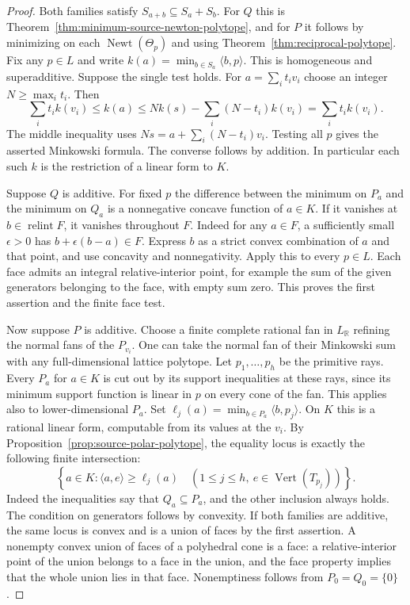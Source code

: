 \documentclass[11pt,reqno]{amsart}
\numberwithin{equation}{section}
\theoremstyle{definition}
\theoremstyle{remark}
\DeclareMathOperator{\Newt}{Newt}
\begin{document}
\begin{proof}
Both families satisfy \(S_{a+b}\subseteq S_a+S_b\). For \(Q\) this is
Theorem~\ref{thm:minimum-source-newton-polytope}, and for \(P\) it
follows by minimizing on each \(\Newt(\Theta_p)\) and using
Theorem~\ref{thm:reciprocal-polytope}. Fix any \(p\in L\) and write
\(k(a)=\min_{b\in S_a}\langle b,p\rangle\). This is homogeneous and
superadditive. Suppose the single test holds. For
\(a=\sum_i t_i v_i\) choose an integer \(N\ge\max_i t_i\). Then
\[ \sum_i t_i k(v_i)\le k(a) \le N k(s)-\sum_i(N-t_i)k(v_i)=\sum_i t_i k(v_i). \]
The middle inequality uses \(Ns=a+\sum_i(N-t_i)v_i\).
Testing all \(p\) gives the asserted Minkowski formula. The converse
follows by addition. In particular each such \(k\) is the restriction
of a linear form to \(K\).

Suppose \(Q\) is additive. For fixed \(p\) the difference between the
minimum on \(P_a\) and the minimum on \(Q_a\) is a nonnegative concave
function of \(a\in K\). If it vanishes at \(b\in\operatorname{relint}F\),
it vanishes throughout \(F\). Indeed for any \(a\in F\), a sufficiently
small \(\epsilon>0\) has \(b+\epsilon(b-a)\in F\). Express \(b\) as a
strict convex combination of \(a\) and that point, and use concavity
and nonnegativity. Apply this to every \(p\in L\). Each face admits an
integral relative-interior point, for example the sum of the given
generators belonging to the face, with empty sum zero. This proves
the first assertion and the finite face test.

Now suppose \(P\) is additive. Choose a finite complete rational fan
in \(L_{\mathbb R}\) refining the normal fans of the \(P_{v_i}\). One
can take the normal fan of their Minkowski sum with any
full-dimensional lattice polytope. Let \(p_1,\ldots,p_h\) be the
primitive rays. Every \(P_a\) for \(a\in K\) is cut out by its support
inequalities at these rays, since its minimum support function is
linear in \(p\) on every cone of the fan. This applies also to
lower-dimensional \(P_a\). Set
\(\ell_j(a)=\min_{b\in P_a}\langle b,p_j\rangle\). On \(K\) this is
a rational linear form, computable from its values at the \(v_i\).
By Proposition~\ref{prop:source-polar-polytope}, the equality locus
is exactly the following finite intersection:
\[ \left\{a\in K: \langle a,e\rangle\ge\ell_j(a)\quad (1\le j\le h,\ e\in\operatorname{Vert}(T_{p_j}))\right\}. \]
Indeed the inequalities say that \(Q_a\subseteq P_a\), and the other
inclusion always holds. The condition on generators follows by
convexity. If both families are additive, the same locus is convex
and is a union of faces by the first assertion. A nonempty convex
union of faces of a polyhedral cone is a face: a relative-interior
point of the union belongs to a face in the union, and the face
property implies that the whole union lies in that face. Nonemptiness follows
from \(P_0=Q_0=\{0\}\).
\end{proof}
\end{document}
